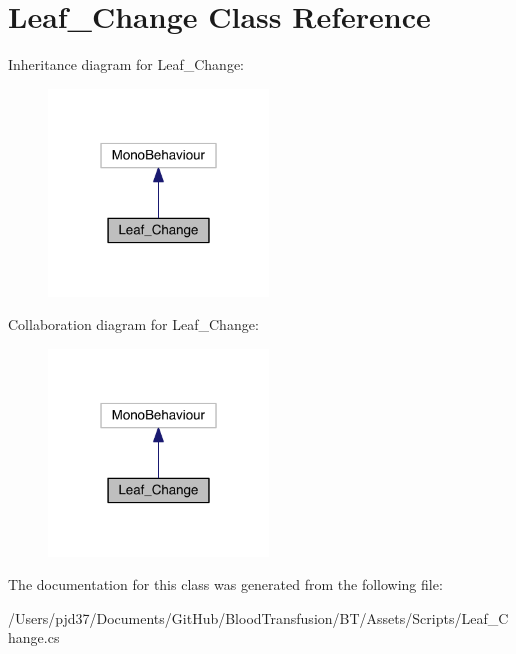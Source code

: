 \hypertarget{class_leaf___change}{}\section{Leaf\+\_\+\+Change Class Reference}
\label{class_leaf___change}


Inheritance diagram for Leaf\+\_\+\+Change\+:\nopagebreak
\begin{figure}[H]
\begin{center}
\leavevmode
\includegraphics[width=166pt]{class_leaf___change__inherit__graph}
\end{center}
\end{figure}


Collaboration diagram for Leaf\+\_\+\+Change\+:\nopagebreak
\begin{figure}[H]
\begin{center}
\leavevmode
\includegraphics[width=166pt]{class_leaf___change__coll__graph}
\end{center}
\end{figure}


The documentation for this class was generated from the following file\+:\begin{DoxyCompactItemize}
\item 
/\+Users/pjd37/\+Documents/\+Git\+Hub/\+Blood\+Transfusion/\+B\+T/\+Assets/\+Scripts/Leaf\+\_\+\+Change.\+cs\end{DoxyCompactItemize}
